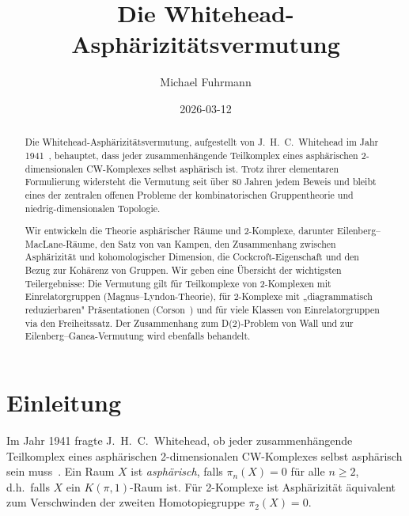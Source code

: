 \documentclass[12pt,a4paper]{amsart}
\theoremstyle{definition}
\theoremstyle{remark}
\begin{document}
\begin{abstract}
Die Whitehead-Asphärizitätsvermutung, aufgestellt von J.~H.~C.~Whitehead
im Jahr 1941~\cite{Whitehead1941}, behauptet, dass jeder zusammenhängende
Teilkomplex eines asphärischen 2-dimensionalen CW-Komplexes selbst asphärisch
ist. Trotz ihrer elementaren Formulierung widersteht die Vermutung seit über
80 Jahren jedem Beweis und bleibt eines der zentralen offenen Probleme der
kombinatorischen Gruppentheorie und niedrig-dimensionalen Topologie.

Wir entwickeln die Theorie asphärischer Räume und 2-Komplexe, darunter
Eilenberg--MacLane-Räume, den Satz von van Kampen, den Zusammenhang zwischen
Asphärizität und kohomologischer Dimension, die Cockcroft-Eigenschaft und
den Bezug zur Kohärenz von Gruppen. Wir geben eine Übersicht der wichtigsten
Teilergebnisse: Die Vermutung gilt für Teilkomplexe von 2-Komplexen mit
Einrelatorgruppen (Magnus--Lyndon-Theorie), für 2-Komplexe mit
„diagrammatisch reduzierbaren" Präsentationen (Corson~\cite{Corson1992})
und für viele Klassen von Einrelatorgruppen via den Freiheitssatz.
Der Zusammenhang zum D(2)-Problem von Wall und zur Eilenberg--Ganea-Vermutung
wird ebenfalls behandelt.
\end{abstract}

\title{Die Whitehead-Asphärizitätsvermutung}
\author{Michael Fuhrmann}
\address{Specialist Mathematics Project, Build 165}
\date{2026-03-12}

\maketitle

\section{Einleitung}

Im Jahr 1941 fragte J.~H.~C.~Whitehead, ob jeder zusammenhängende
Teilkomplex eines asphärischen 2-dimensionalen CW-Komplexes selbst
asphärisch sein muss~\cite{Whitehead1941}. Ein Raum $X$ ist
\emph{asphärisch}, falls $\pi_n(X) = 0$ für alle $n \geq 2$, d.h.\
falls $X$ ein $K(\pi, 1)$-Raum ist. Für 2-Komplexe ist Asphärizität
äquivalent zum Verschwinden der zweiten Homotopiegruppe $\pi_2(X) = 0$.
\end{document}
